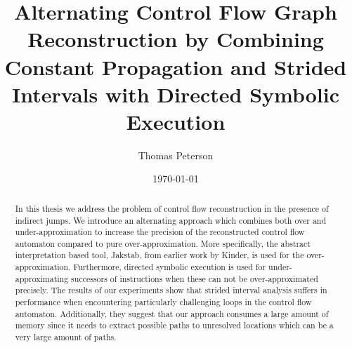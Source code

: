 \documentclass{kththesis}
\title{Alternating Control Flow Graph Reconstruction by Combining Constant Propagation and Strided Intervals with Directed Symbolic Execution}
\author{Thomas Peterson}
\date{\today}
\begin{document}
\frontmatter

\titlepage

\begin{abstract}
In this thesis we address the problem of control flow reconstruction in the presence of indirect jumps. We introduce an alternating approach which combines both over and under-approximation to increase the precision of the reconstructed control flow automaton compared to pure over-approximation. More specifically, the abstract interpretation based tool, Jakstab, from earlier work by Kinder, is used for the over-approximation. Furthermore, directed symbolic execution is used for under-approximating successors of instructions when these can not be over-approximated precisely. The results of our experiments show that strided interval analysis suffers in performance when encountering particularly challenging loops in the control flow automaton. Additionally, they suggest that our approach consumes a large amount of memory since it needs to extract possible paths to unresolved locations which can be a very large amount of paths. 
\end{abstract}
\end{document}
